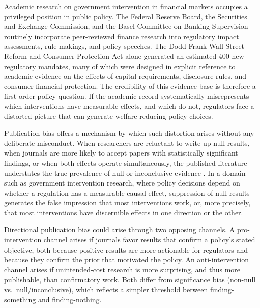 \documentclass[12pt]{article}
\begin{document}
Academic research on government intervention in financial markets occupies a
privileged position in public policy.  The Federal Reserve Board, the
Securities and Exchange Commission, and the Basel Committee on Banking
Supervision routinely incorporate peer-reviewed finance research into
regulatory impact assessments, rule-makings, and policy speeches.  The
Dodd-Frank Wall Street Reform and Consumer Protection Act alone generated an
estimated 400 new regulatory mandates, many of which were designed in explicit
reference to academic evidence on the effects of capital requirements,
disclosure rules, and consumer financial protection.  The credibility of this
evidence base is therefore a first-order policy question.  If the academic record
systematically misrepresents which interventions have measurable effects, and
which do not, regulators face a distorted picture that can generate
welfare-reducing policy choices.

Publication bias offers a mechanism by which such distortion arises without any
deliberate misconduct.  When researchers are reluctant to write up null results,
when journals are more likely to accept papers with statistically significant
findings, or when both effects operate simultaneously, the published literature
understates the true prevalence of null or inconclusive evidence
\citep*{Franco2014}.  In a domain such as government intervention research,
where policy decisions depend on whether a regulation has a measurable causal
effect, suppression of null results generates the false impression that most
interventions work, or, more precisely, that most interventions have discernible
effects in one direction or the other.

Directional publication bias could arise through two opposing channels.
A pro-intervention channel arises if journals favor results
that confirm a policy's stated objective, both because positive
results are more actionable for regulators and because they confirm
the prior that motivated the policy.  An anti-intervention channel arises if unintended-cost research is more surprising, and
thus more publishable, than confirmatory work.  Both differ from
significance bias (non-null vs.\ null/inconclusive), which
reflects a simpler threshold between finding-something and
finding-nothing.
\end{document}
